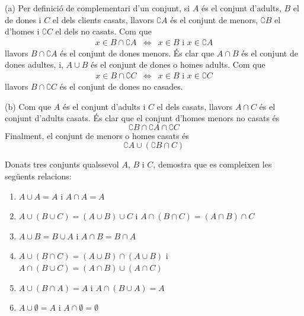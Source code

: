\begin{solucio}
(a) Per definició de complementari d'un conjunt, si $A$ és el
conjunt d'adults, $B$ el de dones i $C$ el dels clients casats, llavors 
$\complement A$ és el conjunt de menors, $\complement B$ el d'homes i $%
\complement C$ el dels no casats. Com que%
\begin{equation*}
\begin{array}{ccc}
x\in B\cap \complement A & \Longleftrightarrow & x\in B\text{ i }x\in
\complement A%
\end{array}%
\end{equation*}%
llavors $B\cap \complement A$ és el conjunt de dones menors. És clar
que $A\cap B$ és el conjunt de dones adultes, i, $A\cup B$ és el
conjunt de dones o homes adults. Com que%
\begin{equation*}
\begin{array}{ccc}
x\in B\cap \complement C & \Longleftrightarrow & x\in B\text{ i }x\in
\complement C%
\end{array}%
\end{equation*}%
llavors $B\cap \complement C$ és el conjunt de dones no casades.

(b) Com que $A$ és el conjunt d'adults i $C$ el dels casats, llavors 
$A\cap C$ és el conjunt d'adults casats. És clar que el conjunt
d'homes menors no casats és%
\begin{equation*}
\complement B\cap \complement A\cap \complement C
\end{equation*}%
Finalment, el conjunt de menors o homes casats és%
\begin{equation*}
\complement A\cup (\complement B\cap C)
\end{equation*}
\end{solucio}

\begin{exercici}
Donats tres conjunts qualssevol $A$, $B$ i $C$, demostra que es compleixen
les següents relacions:

\begin{enumerate}
\item $A\cup A=A$ i $A\cap A=A$

\item $A\cup (B\cup C)=(A\cup B)\cup C$ i $A\cap (B\cap C)=(A\cap B)\cap C$

\item $A\cup B=B\cup A$ i $A\cap B=B\cap A$

\item $A\cup (B\cap C)=(A\cup B)\cap (A\cup B)$ i $A\cap (B\cup C)=(A\cap
B)\cup (A\cap C)$

\item $A\cup (B\cap A)=A$ i $A\cap (B\cup A)=A$

\item $A\cup \emptyset =A$ i $A\cap \emptyset =\emptyset $
\end{enumerate}
\end{exercici}

